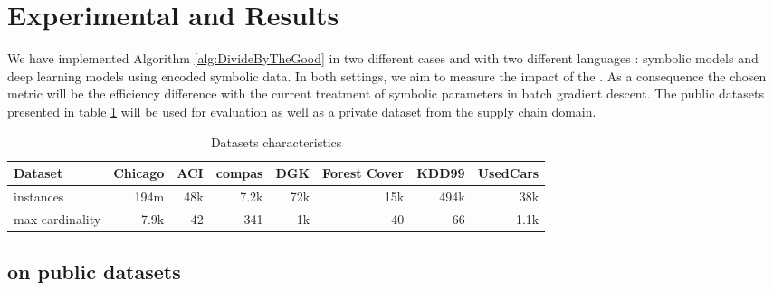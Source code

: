 \section{Experimental and Results}\label{Results}


We have implemented Algorithm \ref{alg:DivideByTheGood} in two different cases and with two different languages : symbolic models and deep learning models using encoded symbolic data. In both settings, we aim to measure the impact of the \tecname. As a consequence the chosen metric will be the efficiency difference with the current treatment of symbolic parameters in batch gradient descent. The public datasets presented in table \ref{tab:datasetChar} will be used for evaluation as well as a private dataset from the supply chain domain.


\begin{table}[h!] 
  \caption{Datasets characteristics}
  \label{tab:datasetChar}
  \begin{footnotesize}
  \begin{center}
  \begin{tabular}{l|rrrrrrr}
    \textbf{Dataset} & Chicago & ACI & compas & DGK  & Forest Cover & KDD99 & UsedCars \\
    \midrule
    instances        & 194m    & 48k & 7.2k   & 72k  & 15k          & 494k  & 38k      \\
    \midrule 
    max cardinality  & 7.9k    & 42  & 341    & 1k & 40             & 66    & 1.1k     \\ 
    \bottomrule		
\end{tabular}
\end{center}
\end{footnotesize}
\end{table}



\subsection{\catmod on public datasets}\label{subsec:public}
\vline


